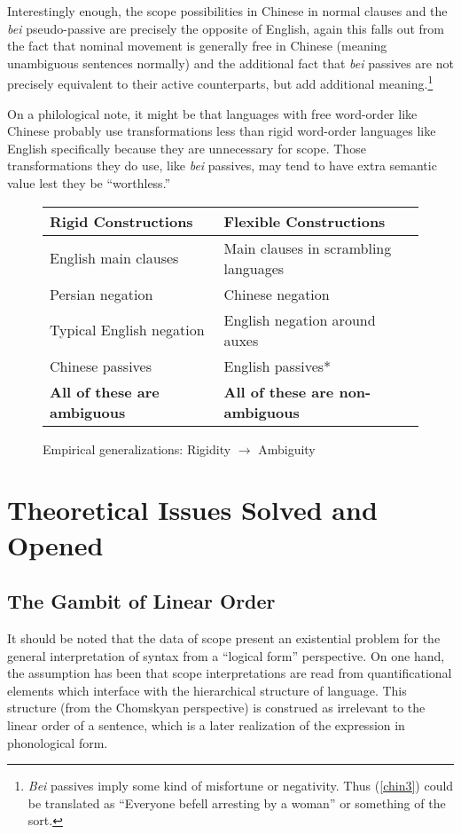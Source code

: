 \documentclass{article}
\begin{document}
Interestingly enough, the scope possibilities in Chinese in normal clauses and the \emph{bei} pseudo-passive are precisely the opposite of English, again this falls out from the fact that nominal movement is generally free in Chinese (meaning unambiguous sentences normally) and the additional fact that \emph{bei} passives are not precisely equivalent to their active counterparts, but add additional meaning.\footnote{\emph{Bei} passives imply some kind of misfortune or negativity. Thus (\ref{chin3}) could be translated as ``Everyone befell arresting by a woman'' or something of the sort.}

On a philological note, it might be that languages with free word-order like Chinese probably use transformations less than rigid word-order languages like English specifically because they are unnecessary for scope. Those transformations they do use, like \emph{bei} passives, may tend to have extra semantic value lest they be ``worthless.''


\begin{figure}
\begin{tabular}{ll}
	Rigid Constructions & Flexible Constructions \\\hline\hline
	English main clauses & Main clauses in scrambling languages \\
	Persian negation & Chinese negation \\
	Typical English negation & English negation around auxes \\
	Chinese passives & English passives*\\
	\textbf{All of these are ambiguous} & \textbf{All of these are non-ambiguous}\\
\end{tabular}
	\caption{Empirical generalizations: Rigidity ${\rightarrow}$ Ambiguity}
\end{figure}

\section{Theoretical Issues Solved and Opened}

\subsection{The Gambit of Linear Order}

It should be noted that the data of scope present an existential problem for the general interpretation of syntax from a ``logical form'' perspective. On one hand, the assumption has been that scope interpretations are read from quantificational elements which interface with the hierarchical structure of language. This structure (from the Chomskyan perspective) is construed as irrelevant to the linear order of a sentence, which is a later realization of the expression in phonological form.
\end{document}
